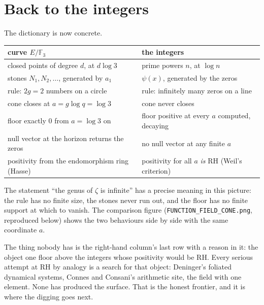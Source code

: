 \documentclass[11pt]{article}
\newcommand{\F}{\mathbb F}
\begin{document}
\section{Back to the integers}

The dictionary is now concrete.
\begin{center}\small
\begin{tabular}{ll}
\toprule
curve $E/\F_3$ & the integers\\
\midrule
closed points of degree $d$, at $d\log3$ & prime powers $n$, at $\log n$\\
stones $N_1,N_2,\dots$, generated by $a_1$ & $\psi(x)$, generated by the zeros\\
rule: $2g=2$ numbers on a circle & rule: infinitely many zeros on a line\\
cone closes at $a=g\log q=\log3$ & cone never closes\\
floor exactly $0$ from $a=\log3$ on & floor positive at every $a$ computed, decaying\\
null vector at the horizon returns the zeros & no null vector at any finite $a$\\
positivity from the endomorphism ring (Hasse) & positivity for all $a$ \emph{is} RH (Weil's criterion)\\
\bottomrule
\end{tabular}
\end{center}
The statement ``the genus of $\zeta$ is infinite'' has a precise meaning in this picture: the rule has no finite size, the stones never run out, and the floor has no finite support at which to vanish. The comparison figure (\texttt{FUNCTION\_FIELD\_CONE.png}, reproduced below) shows the two behaviours side by side with the same coordinate $a$.

The thing nobody has is the right-hand column's last row with a reason in it: the object one floor above the integers whose positivity would be RH. Every serious attempt at RH by analogy is a search for that object: Deninger's foliated dynamical systems, Connes and Consani's arithmetic site, the field with one element. None has produced the surface. That is the honest frontier, and it is where the digging goes next.
\end{document}
